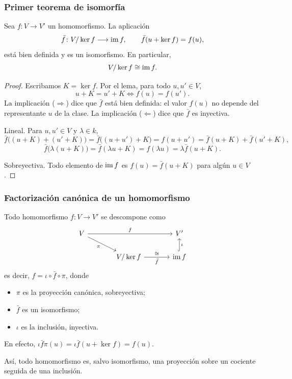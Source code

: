 \begin{frame}[allowframebreaks, t]
    \frametitle{Primer teorema de isomorfía}

    \begin{theorem}
        Sea $f\colon V\to V'$ un homomorfismo. La aplicación
        \[
            \bar f\colon V/\ker f\longrightarrow\operatorname{im} f,
            \qquad
            \bar f(u+\ker f)=f(u),
        \]
        está bien definida y es un isomorfismo. En particular,
        \[
            V/\ker f\cong\operatorname{im} f.
        \]
    \end{theorem}

    \framebreak

    \begin{proof}
        Escribamos $K=\ker f$. Por el lema, para todo $u,u'\in V$,
        \[
            u+K=u'+K\iff f(u)=f(u').
        \]
        La implicación ($\Rightarrow$) dice que $\bar f$ \alert{está bien
        definida}: el valor $f(u)$ no depende del representante $u$ de la
        clase. La implicación ($\Leftarrow$) dice que $\bar f$ es
        \alert{inyectiva}.

        \alert{Lineal.} Para $u,u'\in V$ y $\lambda\in k$,
        \[
            \bar f\bigl((u+K)+(u'+K)\bigr)=\bar f\bigl((u+u')+K\bigr)
            =f(u+u')=\bar f(u+K)+\bar f(u'+K),
        \]
        \[
            \bar f\bigl(\lambda(u+K)\bigr)=\bar f(\lambda u+K)
            =f(\lambda u)=\lambda\bar f(u+K).
        \]

        \alert{Sobreyectiva.} Todo elemento de $\operatorname{im} f$ es $f(u)=\bar f(u+K)$
        para algún $u\in V$.
    \end{proof}
\end{frame}


\begin{frame}[fragile]
    \frametitle{Factorización canónica de un homomorfismo}

    Todo homomorfismo $f\colon V\to V'$ se descompone como
    \[
        \begin{tikzcd}[column sep=large]
            V\arrow[rr,"f"]\arrow[dr,"\pi"'] & & V'\\
            & V/\ker f\arrow[r,"\bar f"',"\cong"] & \im f\arrow[u,hook,"\iota"']
        \end{tikzcd}
    \]
    es decir, $f=\iota\circ\bar f\circ\pi$, donde
    \begin{itemize}
        \item $\pi$ es la proyección canónica, \alert{sobreyectiva};
        \item $\bar f$ es un \alert{isomorfismo};
        \item $\iota$ es la inclusión, \alert{inyectiva}.
    \end{itemize}

    \medskip

    En efecto, $\iota\bar f\pi(u)=\iota\bar f(u+\ker f)=f(u)$.

    \medskip

    Así, \alert{todo} homomorfismo es, salvo isomorfismo, una proyección
    sobre un cociente seguida de una inclusión.
\end{frame}


